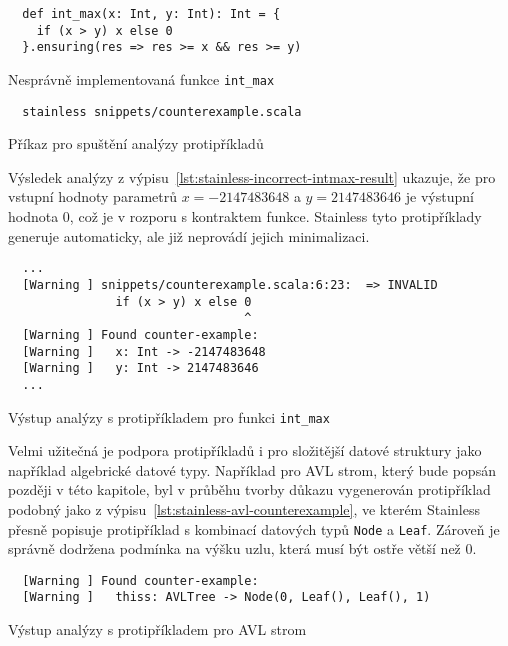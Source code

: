 \begin{listing}[H]
  \begin{verbatim}
  def int_max(x: Int, y: Int): Int = {
    if (x > y) x else 0
  }.ensuring(res => res >= x && res >= y)
  \end{verbatim}
  \caption{Nesprávně implementovaná funkce \texttt{int\_max}}
  \label{lst:stainless-incorrect-intmax}
\end{listing}

\begin{listing}[H]
  \begin{verbatim}
  stainless snippets/counterexample.scala
  \end{verbatim}
  \caption{Příkaz pro spuštění analýzy protipříkladů}
  \label{lst:stainless-incorrect-intmax-run}
\end{listing}

Výsledek analýzy z výpisu~\ref{lst:stainless-incorrect-intmax-result} ukazuje,
že pro vstupní hodnoty parametrů
$x = -2147483648$ a $y = 2147483646$
je výstupní hodnota $0$, což je v rozporu s kontraktem funkce.
Stainless tyto protipříklady generuje automaticky,
ale již neprovádí jejich minimalizaci.

\begin{listing}[H]
  \begin{verbatim}
  ...
  [Warning ] snippets/counterexample.scala:6:23:  => INVALID
               if (x > y) x else 0
                                 ^
  [Warning ] Found counter-example:
  [Warning ]   x: Int -> -2147483648
  [Warning ]   y: Int -> 2147483646
  ...
  \end{verbatim}
  \caption{Výstup analýzy s protipříkladem pro funkci \texttt{int\_max}}
  \label{lst:stainless-incorrect-intmax-result}
\end{listing}

Velmi užitečná je podpora protipříkladů i pro složitější datové struktury
jako například algebrické datové typy.
Například pro AVL strom, který bude popsán později v této kapitole,
byl v průběhu tvorby důkazu vygenerován protipříklad podobný jako z výpisu~\ref{lst:stainless-avl-counterexample},
ve kterém Stainless přesně popisuje protipříklad s kombinací datových typů \texttt{Node} a \texttt{Leaf}.
Zároveň je správně dodržena podmínka na výšku uzlu, která musí být ostře větší než 0.

\begin{listing}[H]
  \begin{verbatim}
  [Warning ] Found counter-example:
  [Warning ]   thiss: AVLTree -> Node(0, Leaf(), Leaf(), 1)
  \end{verbatim}
  \caption{Výstup analýzy s protipříkladem pro AVL strom}
  \label{lst:stainless-avl-counterexample}
\end{listing}

